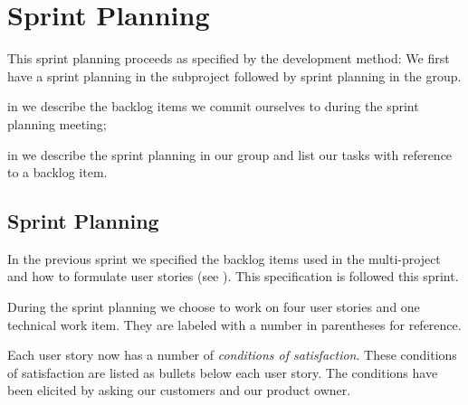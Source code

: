 \chapter{Sprint Planning}\label{chap:s4_sprintplanning}
This sprint planning proceeds as specified by the development method: We first have a sprint planning in the subproject followed by sprint planning in the group.

\begin{chapterorganization}
  \item in  we describe the backlog items we commit ourselves to during the \bd sprint planning meeting;
  \item in  we describe the sprint planning in our group and list our tasks with reference to a backlog item.
\end{chapterorganization}

\section{\bdtitle Sprint Planning}\label{sec:S4_bd}
In the previous sprint we specified the backlog items used in the multi-project and how to formulate user stories (see ). This specification is followed this sprint.

During the \bd sprint planning we choose to work on four user stories and one technical work item. They are labeled with a number in parentheses for reference. 

Each user story now has a number of \emph{conditions of satisfaction}. These conditions of satisfaction are listed as bullets below each user story. The conditions have been elicited by asking our customers and our product owner.

